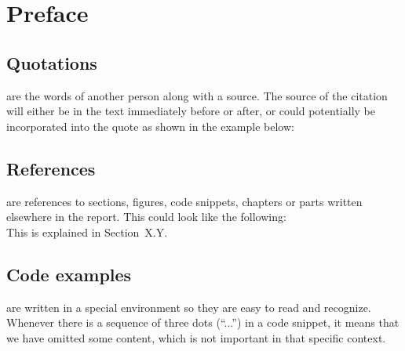 \chapter{Preface}
\label{preface}


\section{Quotations} are the words of another person along with a source.
The source of the citation will either be in the text immediately before or after, or could potentially be incorporated into the quote as shown in the example below: \\


\section{References} are references to sections, figures, code snippets, chapters or parts written elsewhere in the report. 
This could look like the following:\\

This is explained in Section~X.Y.

\section{Code examples} are written in a special environment so they are easy to read and recognize. 
Whenever there is a sequence of three dots (``...'') in a code snippet, it means that we have omitted some content, which is not important in that specific context.

%
